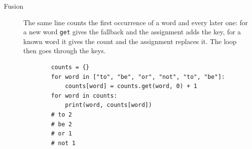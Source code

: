 \begin{description}
  \item[Fusion] The same line counts the first occurrence of a word and every
    later one: for a new word \texttt{get} gives the fallback and
    the assignment adds the key, for a known word it gives the count and the
    assignment replaces it. The loop then goes through the keys.

    \hfill
    \begin{minipage}[t]{0.8\columnwidth}
      \begin{verbatim}
        counts = {}
        for word in ["to", "be", "or", "not", "to", "be"]:
            counts[word] = counts.get(word, 0) + 1
        for word in counts:
            print(word, counts[word])
        # to 2
        # be 2
        # or 1
        # not 1
      \end{verbatim}
    \end{minipage}
    \hfill\null
\end{description}
